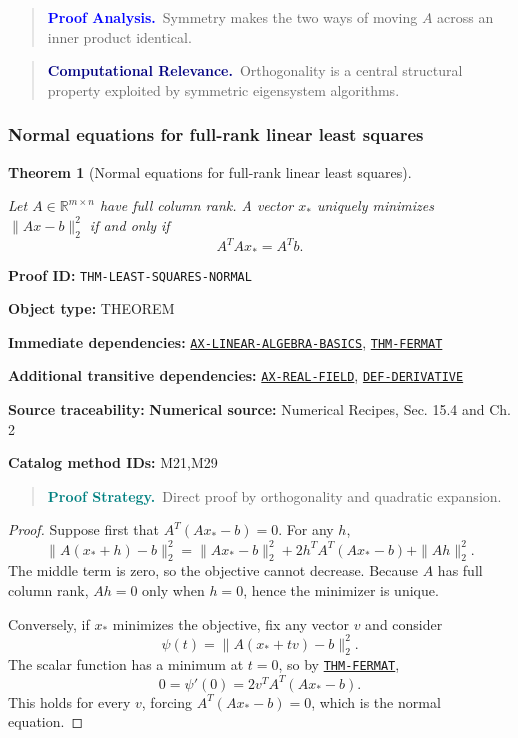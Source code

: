 \documentclass[10pt]{article}
\newcommand{\pidraw}[1]{\begingroup\urlstyle{tt}\nolinkurl{#1}\endgroup}
\newcommand{\pidref}[1]{\hyperref[prf:#1]{\pidraw{#1}}}
\newcommand{\pid}[1]{\pidref{#1}}
\newtheorem{theorem}{Theorem}[section]
\theoremstyle{definition}
\theoremstyle{remark}
\newenvironment{proofstrategy}
{\begin{quote}\small\noindent\textbf{\textcolor{teal}{Proof Strategy.}}\ }
{\end{quote}}
\newenvironment{proofanalysis}
{\begin{quote}\small\noindent\textbf{\textcolor{blue}{Proof Analysis.}}\ }
{\end{quote}}
\newenvironment{computationalrelevance}
{\begin{quote}\small\noindent\textbf{\textcolor{navy}{Computational Relevance.}}\ }
{\end{quote}}
\newcommand{\meta}[2]{\noindent\textbf{#1:} #2\par}
\begin{document}
\begin{proofanalysis}Symmetry makes the two ways of moving $A$ across an inner product identical.\end{proofanalysis}

\begin{computationalrelevance}Orthogonality is a central structural property exploited by symmetric eigensystem algorithms.\end{computationalrelevance}

\subsubsection{Normal equations for full-rank linear least squares}

\begin{theorem}[Normal equations for full-rank linear least squares]\label{prf:THM-LEAST-SQUARES-NORMAL}

Let $A\in\mathbb{R}^{m\times n}$ have full column rank. A vector $x_*$ uniquely minimizes
$\|Ax-b\|_2^2$ if and only if
\[
A^TAx_*=A^Tb.
\]

\end{theorem}

\meta{Proof ID}{\pidraw{THM-LEAST-SQUARES-NORMAL}}
\meta{Object type}{THEOREM}
\meta{Immediate dependencies}{\pidref{AX-LINEAR-ALGEBRA-BASICS}, \pidref{THM-FERMAT}}
\meta{Additional transitive dependencies}{\pidref{AX-REAL-FIELD}, \pidref{DEF-DERIVATIVE}}
\meta{Source traceability}{\textbf{Numerical source:} Numerical Recipes, Sec. 15.4 and Ch. 2}
\meta{Catalog method IDs}{M21,M29}

\begin{proofstrategy}Direct proof by orthogonality and quadratic expansion.\end{proofstrategy}

\begin{proof}

Suppose first that $A^T(Ax_*-b)=0$. For any $h$,
\[
\|A(x_*+h)-b\|_2^2
=
\|Ax_*-b\|_2^2
+2h^TA^T(Ax_*-b)+\|Ah\|_2^2.
\]
The middle term is zero, so the objective cannot decrease. Because $A$ has full
column rank, $Ah=0$ only when $h=0$, hence the minimizer is unique.

Conversely, if $x_*$ minimizes the objective, fix any vector $v$ and consider
\[
\psi(t)=\|A(x_*+tv)-b\|_2^2.
\]
The scalar function has a minimum at $t=0$, so by \pid{THM-FERMAT},
\[
0=\psi'(0)=2v^TA^T(Ax_*-b).
\]
This holds for every $v$, forcing $A^T(Ax_*-b)=0$, which is the normal equation.

\end{proof}
\end{document}
